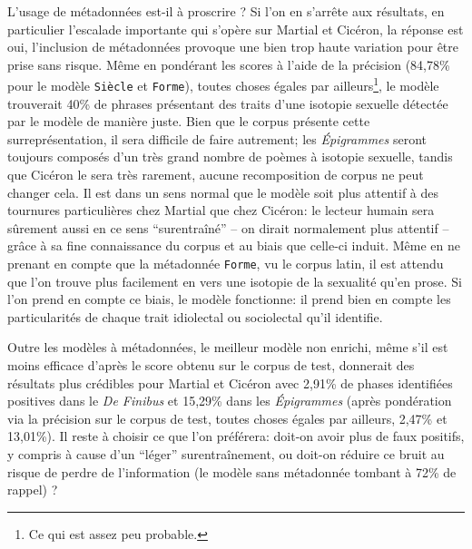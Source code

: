 L'usage de métadonnées est-il à proscrire ? Si l'on en s'arrête aux résultats, en particulier l'escalade importante qui s'opère sur Martial et Cicéron, la réponse est oui, l'inclusion de métadonnées provoque une bien trop haute variation pour être prise sans risque. Même en pondérant les scores à l'aide de la précision (84,78\% pour le modèle \texttt{Siècle} et \texttt{Forme}), toutes choses égales par ailleurs\footnote{Ce qui est assez peu probable.}, le modèle trouverait 40\% de phrases présentant des traits d'une isotopie sexuelle détectée par le modèle de manière juste. Bien que le corpus présente cette surreprésentation, il sera difficile de faire autrement; les \textit{Épigrammes} seront toujours composés d'un très grand nombre de poèmes à isotopie sexuelle, tandis que Cicéron le sera très rarement, aucune recomposition de corpus ne peut changer cela. Il est dans un sens normal que le modèle soit plus attentif à des tournures particulières chez Martial que chez Cicéron: le lecteur humain sera sûrement aussi en ce sens \enquote{surentraîné} -- on dirait normalement plus attentif -- grâce à sa fine connaissance du corpus et au biais que celle-ci induit. Même en ne prenant en compte que la métadonnée \texttt{Forme}, vu le corpus latin, il est attendu que l'on trouve plus facilement en vers une isotopie de la sexualité qu'en prose. Si l'on prend en compte ce biais, le modèle fonctionne: il prend bien en compte les particularités de chaque trait idiolectal ou sociolectal qu'il identifie.

Outre les modèles à métadonnées, le meilleur modèle non enrichi, même s'il est moins efficace d'après le score obtenu sur le corpus de test, donnerait des résultats plus crédibles pour Martial et Cicéron avec 2,91\% de phases identifiées positives dans le \textit{De Finibus} et 15,29\% dans les \textit{Épigrammes} (après pondération via la précision sur le corpus de test, toutes choses égales par ailleurs, 2,47\% et 13,01\%). Il reste à choisir ce que l'on préférera: doit-on avoir plus de faux positifs, y compris à cause d'un \enquote{léger} surentraînement, ou doit-on réduire ce bruit au risque de perdre de l'information (le modèle sans métadonnée tombant à 72\% de rappel) ? 


